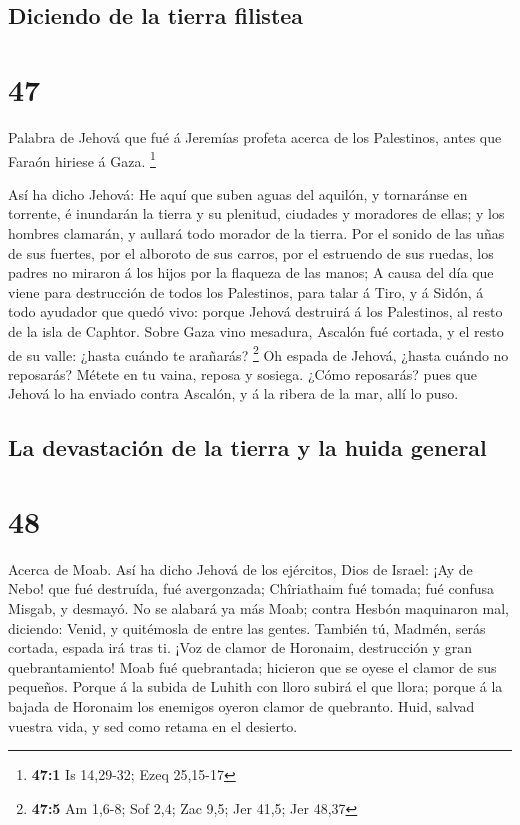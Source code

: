 \hypertarget{diciendo-de-la-tierra-filistea}{%
\subsection{Diciendo de la tierra
filistea}\label{diciendo-de-la-tierra-filistea}}

\hypertarget{section-46}{%
\section{47}\label{section-46}}

 Palabra de Jehová que fué á Jeremías profeta acerca de los
Palestinos, antes que Faraón hiriese á Gaza. \footnote{\textbf{47:1} Is
  14,29-32; Ezeq 25,15-17}

 Así ha dicho Jehová: He aquí que suben aguas del aquilón, y
tornaránse en torrente, é inundarán la tierra y su plenitud, ciudades y
moradores de ellas; y los hombres clamarán, y aullará todo morador de la
tierra.  Por el sonido de las uñas de sus fuertes, por el
alboroto de sus carros, por el estruendo de sus ruedas, los padres no
miraron á los hijos por la flaqueza de las manos;  A causa
del día que viene para destrucción de todos los Palestinos, para talar á
Tiro, y á Sidón, á todo ayudador que quedó vivo: porque Jehová destruirá
á los Palestinos, al resto de la isla de Caphtor.  Sobre
Gaza vino mesadura, Ascalón fué cortada, y el resto de su valle: ¿hasta
cuándo te arañarás? \footnote{\textbf{47:5} Am 1,6-8; Sof 2,4; Zac 9,5;
  Jer 41,5; Jer 48,37}  Oh espada de Jehová, ¿hasta cuándo
no reposarás? Métete en tu vaina, reposa y sosiega.  ¿Cómo
reposarás? pues que Jehová lo ha enviado contra Ascalón, y á la ribera
de la mar, allí lo puso.

\hypertarget{la-devastaciuxf3n-de-la-tierra-y-la-huida-general}{%
\subsection{La devastación de la tierra y la huida
general}\label{la-devastaciuxf3n-de-la-tierra-y-la-huida-general}}

\hypertarget{section-47}{%
\section{48}\label{section-47}}

 Acerca de Moab. Así ha dicho Jehová de los ejércitos, Dios
de Israel: ¡Ay de Nebo! que fué destruída, fué avergonzada; Chîriathaim
fué tomada; fué confusa Misgab, y desmayó.  No se alabará ya
más Moab; contra Hesbón maquinaron mal, diciendo: Venid, y quitémosla de
entre las gentes. También tú, Madmén, serás cortada, espada irá tras ti.
 ¡Voz de clamor de Horonaim, destrucción y gran
quebrantamiento!  Moab fué quebrantada; hicieron que se
oyese el clamor de sus pequeños.  Porque á la subida de
Luhith con lloro subirá el que llora; porque á la bajada de Horonaim los
enemigos oyeron clamor de quebranto.  Huid, salvad vuestra
vida, y sed como retama en el desierto.

